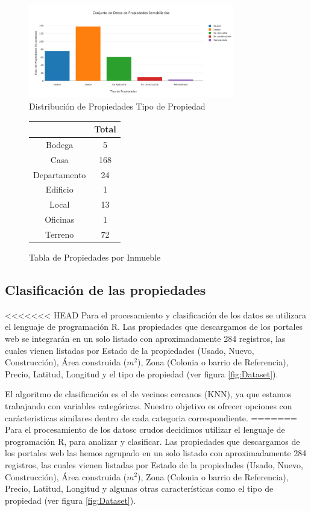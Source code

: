 \begin{figure}[ht]
\centering
\includegraphics[width=0.8\textwidth]{PropiedadesInmobiliariasEstadoVivienda.png}
\caption{Distribución de Propiedades Tipo de Propiedad}
\label{fig:PropiedadesType}
\end{figure}

\begin{figure}[ht]
\centering
\begin{tabular}{cc}
  \hline
 & Total \\ 
  \hline
Bodega &   5 \\ 
  Casa & 168 \\ 
  Departamento &  24 \\ 
  Edificio &   1 \\ 
  Local &  13 \\ 
  Oficinas &   1 \\ 
  Terreno &  72 \\ 
   \hline
\end{tabular}
\caption{Tabla de Propiedades por Inmueble}
\label{fig:PropiedadesList}
\end{figure}

\subsection{Clasificación de las propiedades}
<<<<<<< HEAD
Para el procesamiento y clasificación de los datos se utilizara el lenguaje de programación R. Las propiedades que descargamos de los portales web se integrarán en un solo listado con aproximadamente 284 registros, las cuales  vienen listadas por Estado de la propiedades (Usado, Nuevo, Construcción), Área construida ($m^2$), Zona (Colonia o barrio de Referencia), Precio, Latitud, Longitud y el tipo de propiedad (ver figura \ref{fig:Dataset}). 


El algoritmo de clasificación es el de vecinos cercanos (KNN), ya que estamos trabajando con variables categóricas. Nuestro objetivo es ofrecer opciones con carácteristicas similares dentro de cada categoria correspondiente.
=======
Para el procesamiento de los datosc crudos decidimos utilizar el lenguaje de programación R, para analizar y clasificar. Las propiedades que descargamos de los portales web las hemos agrupado en un solo listado con aproximadamente 284 registros, las cuales  vienen listadas por Estado de la propiedades (Usado, Nuevo, Construcción), Área construida ($m^2$), Zona (Colonia o barrio de Referencia), Precio, Latitud, Longitud y algunas otras características como el tipo de propiedad (ver figura \ref{fig:Dataset}). 


